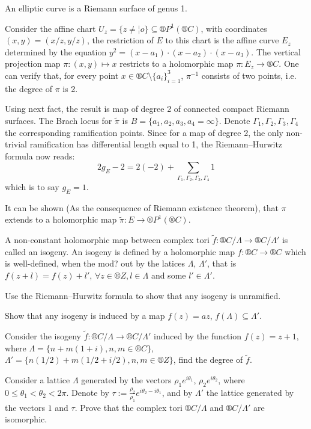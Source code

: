 \documentclass[12pt]{article}					%
\begin{document}
\begin{veta}
	An elliptic curve is a Riemann surface of genus 1.

	\begin{dukazin}
		Consider the affine chart $U_z = \{z ≠ ¦o\} \subseteq ®P^1(®C)$, with coordinates $(x, y) = (x / z, y / z)$, the restriction of $E$ to this chart is the affine curve $E_z$ determined by the equation $y^2 = (x - a_1)·(x - a_2)·(x - a_3)$. The vertical projection map $π: (x, y) \mapsto x$ restricts to a holomorphic map $π: E_z \rightarrow ®C$. One can verify that, for every point $x \in ®C \setminus \{a_i\}_{i=1}^3$, $π^{-1}$ consists of two points, i.e. the degree of $π$ is 2.

		Using next fact, the result is map of degree 2 of connected compact Riemann surfaces. The Brach locus for $\tilde π$ is $B = \{a_1, a_2, a_3, a_4 = ∞\}$. Denote $Γ_1, Γ_2, Γ_3, Γ_4$ the corresponding ramification points. Since for a map of degree 2, the only non-trivial ramification has differential length equal to 1, the Riemann–Hurwitz formula now reads:
		$$ 2g_E - 2 = 2(-2) + \sum_{Γ_1, Γ_2, Γ_3, Γ_4} 1 $$
		which is to say $g_E = 1$.
	\end{dukazin}
\end{veta}

\begin{poznamka}[Fact]
	It can be shown (As the consequence of Riemann existence theorem), that $π$ extends to a holomorphic map $\tilde π: E \rightarrow ®P^1(®C)$.
\end{poznamka}

\begin{priklad}
	A non-constant holomorphic map between complex tori $\tilde f: ®C / Λ \rightarrow ®C / Λ'$ is called an isogeny. An isogeny is defined by a holomorphic map $f: ®C \rightarrow ®C$ which is well-defined, when the mod? out by the latices $Λ$, $Λ'$, that is $f(z + l) = f(z) + l'$, $\forall z \in ®Z, l \in Λ$ and some $l' \in Λ'$.

	Use the Riemann–Hurwitz formula to show that any isogeny is unramified.

	Show that any isogeny is induced by a map $f(z) = az$, $f(Λ) \subseteq Λ'$.

	Consider the isogeny $\tilde f: ®C / Λ \rightarrow ®C / Λ'$ induced by the function $f(z) = z + 1$, where $Λ = \{n + m(1 + i), n, m \in ®C\}$, $Λ' = \{n (1 / 2) + m(1 / 2 + i / 2), n, m \in ®Z\}$, find the degree of $\tilde f$.
\end{priklad}

\begin{priklad}
	Consider a lattice $Λ$ generated by the vectors $ρ_1 e^{i θ_1}$, $ρ_2 e^{iθ_2}$, where $0 ≤ θ_1 < θ_2 < 2π$. Denote by $τ := \frac{ρ_2}{ρ_1} e^{iθ_2 - iθ_1}$, and by $Λ'$ the lattice generated by the vectors $1$ and $τ$. Prove that the complex tori $®C / Λ$ and $®C / Λ'$ are isomorphic.
\end{priklad}
\end{document}
